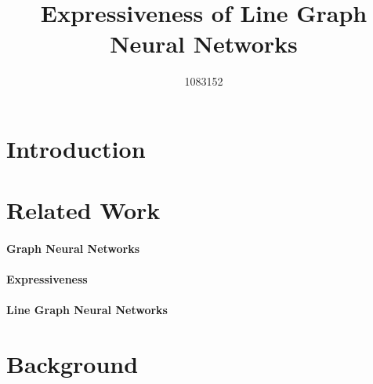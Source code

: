 \documentclass{article}
\title{Expressiveness of Line Graph Neural Networks}
\author{%
    1083152
}
\begin{document}
\maketitle


\begin{abstract}

\end{abstract}


\section{Introduction}








\section{Related Work}

\paragraph{Graph Neural Networks}


\paragraph{Expressiveness}
% 

\paragraph{Line Graph Neural Networks}



\section{Background}    \label{sec:background}
\end{document}
